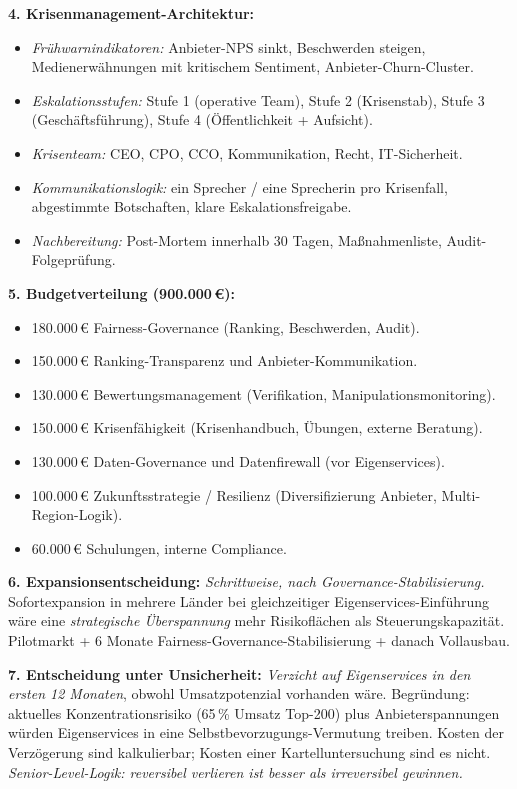 \documentclass[11pt,a4paper,oneside]{article}
\begin{document}
\begin{loesungbox}
\smallskip
\textbf{4. Krisenmanagement-Architektur:}
\begin{itemize}
  \item \emph{Frühwarnindikatoren:} Anbieter-NPS sinkt, Beschwerden steigen, Medienerwähnungen mit kritischem Sentiment, Anbieter-Churn-Cluster.
  \item \emph{Eskalationsstufen:} Stufe 1 (operative Team), Stufe 2 (Krisenstab), Stufe 3 (Geschäftsführung), Stufe 4 (Öffentlichkeit + Aufsicht).
  \item \emph{Krisenteam:} CEO, CPO, CCO, Kommunikation, Recht, IT-Sicherheit.
  \item \emph{Kommunikationslogik:} ein Sprecher / eine Sprecherin pro Krisenfall, abgestimmte Botschaften, klare Eskalationsfreigabe.
  \item \emph{Nachbereitung:} Post-Mortem innerhalb 30 Tagen, Maßnahmenliste, Audit-Folgeprüfung.
\end{itemize}

\textbf{5. Budgetverteilung (900.000\,\euro):}
\begin{itemize}
  \item 180.000\,\euro{} \textendash{} Fairness-Governance (Ranking, Beschwerden, Audit).
  \item 150.000\,\euro{} \textendash{} Ranking-Transparenz und Anbieter-Kommunikation.
  \item 130.000\,\euro{} \textendash{} Bewertungsmanagement (Verifikation, Manipulationsmonitoring).
  \item 150.000\,\euro{} \textendash{} Krisenfähigkeit (Krisenhandbuch, Übungen, externe Beratung).
  \item 130.000\,\euro{} \textendash{} Daten-Governance und Datenfirewall (vor Eigenservices).
  \item 100.000\,\euro{} \textendash{} Zukunftsstrategie / Resilienz (Diversifizierung Anbieter, Multi-Region-Logik).
  \item 60.000\,\euro{} \textendash{} Schulungen, interne Compliance.
\end{itemize}

\textbf{6. Expansionsentscheidung:}
\emph{Schrittweise, nach Governance-Stabilisierung.} Sofortexpansion in mehrere Länder bei gleichzeitiger Eigenservices-Einführung wäre eine \emph{strategische Überspannung} \textendash{} mehr Risikoflächen als Steuerungskapazität. Pilotmarkt + 6 Monate Fairness-Governance-Stabilisierung + danach Vollausbau.

\smallskip
\textbf{7. Entscheidung unter Unsicherheit:}
\emph{Verzicht auf Eigenservices in den ersten 12 Monaten}, obwohl Umsatzpotenzial vorhanden wäre. Begründung: aktuelles Konzentrationsrisiko (65\,\% Umsatz Top-200) plus Anbieterspannungen würden Eigenservices in eine Selbstbevorzugungs-Vermutung treiben. Kosten der Verzögerung sind kalkulierbar; Kosten einer Kartelluntersuchung sind es nicht. \emph{Senior-Level-Logik: reversibel verlieren ist besser als irreversibel gewinnen.}
\end{loesungbox}
\end{document}
